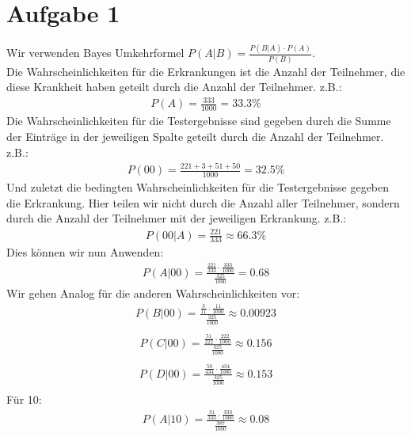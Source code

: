 \section*{Aufgabe 1}
Wir verwenden Bayes Umkehrformel $ P(A | B) = \frac{P(B | A) \cdot P(A)}{P(B)} $.\\
Die Wahrscheinlichkeiten für die Erkrankungen ist die Anzahl der Teilnehmer, die diese Krankheit haben geteilt durch die Anzahl der Teilnehmer. z.B.:
\begin{align*}
  P(A) = \frac{333}{1000} = 33.3\%
\end{align*}
Die Wahrscheinlichkeiten für die Testergebnisse sind gegeben durch die Summe der Einträge in der jeweiligen Spalte geteilt durch die Anzahl der Teilnehmer. z.B.:
\begin{align*}
  P(00) = \frac{221 + 3 + 51 + 50}{1000} = 32.5\%
\end{align*}
Und zuletzt die bedingten Wahrscheinlichkeiten für die Testergebnisse gegeben die Erkrankung. Hier teilen wir nicht durch die Anzahl aller Teilnehmer, sondern durch die Anzahl der Teilnehmer mit der jeweiligen Erkrankung. z.B.:
\begin{align*}
  P(00 | A) = \frac{221}{333} \approx 66.3\%
\end{align*}
Dies können wir nun Anwenden:
\begin{align*}
  P(A | 00) = \frac{ \frac{ 221 }{ 333 } \cdot \frac{ 333 }{ 1000 } }{ \frac{ 325 }{ 1000 }  } =  0.68
\end{align*}
Wir gehen Analog für die anderen Wahrscheinlichkeiten vor:
\begin{align*}
  P(B | 00) = \frac{ \frac{ 3 }{ 11 } \cdot \frac{ 11 }{ 1000 } }{ \frac{ 325 }{ 1000 }  } \approx 0.00923\\
\end{align*}
\begin{align*}
  P(C | 00) = \frac{ \frac{ 51 }{ 222 } \cdot \frac{ 222 }{ 1000 } }{ \frac{ 325 }{ 1000 }  } \approx  0.156\\
\end{align*}
\begin{align*}
  P(D | 00) = \frac{ \frac{ 50 }{ 434 } \cdot \frac{ 434 }{ 1000 } }{ \frac{ 325 }{ 1000 }  } \approx  0.153\\
\end{align*}
Für 10:
\begin{align*}
  P(A | 10) = \frac{ \frac{ 31 }{ 333 } \cdot \frac{ 333 }{ 1000 } }{ \frac{ 387 }{ 1000 }  } \approx  0.08\\
\end{align*}
